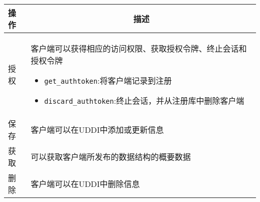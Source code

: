 \begin{longtable}{|m{1.5cm}<{\centering}|m{11.5cm}|}
    \hline
    \textbf{操作} & \multicolumn{1}{c|}{\textbf{描述}} \\ \hline
    授权 &
    客户端可以获得相应的访问权限、获取授权令牌、终止会话和授权令牌
    \begin{itemize}[leftmargin=1.5em,itemsep=-3pt]
        \item \verb|get_authtoken|:将客户端记录到注册
        \item \verb|discard_authtoken|:终止会话，并从注册库中删除客户端
    \vspace{-1.5em}
    \end{itemize}                                           
    \\ \hline
    保存 & 客户端可以在UDDI中添加或更新信息 \\ \hline
    获取 & 可以获取客户端所发布的数据结构的概要数据 \\ \hline
    删除 & 客户端可以在UDDI中删除信息 \\ \hline
\end{longtable}
